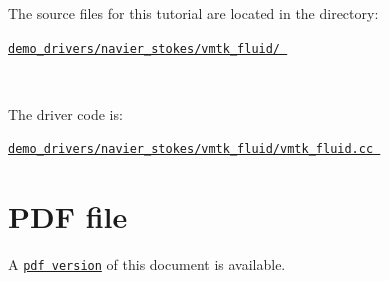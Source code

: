 \begin{DoxyItemize}
\item The source files for this tutorial are located in the directory\+:~\newline
~\newline
\begin{center} \href{../../../../demo_drivers/navier_stokes/vmtk_fluid/}{\tt demo\+\_\+drivers/navier\+\_\+stokes/vmtk\+\_\+fluid/ } \end{center} ~\newline

\item The driver code is\+: ~\newline
~\newline
\begin{center} \href{../../../../demo_drivers/navier_stokes/vmtk_fluid/vmtk_fluid.cc}{\tt demo\+\_\+drivers/navier\+\_\+stokes/vmtk\+\_\+fluid/vmtk\+\_\+fluid.\+cc } \end{center} 
\end{DoxyItemize}



 

 \hypertarget{index_pdf}{}\section{P\+D\+F file}\label{index_pdf}
A \href{../latex/refman.pdf}{\tt pdf version} of this document is available. 
